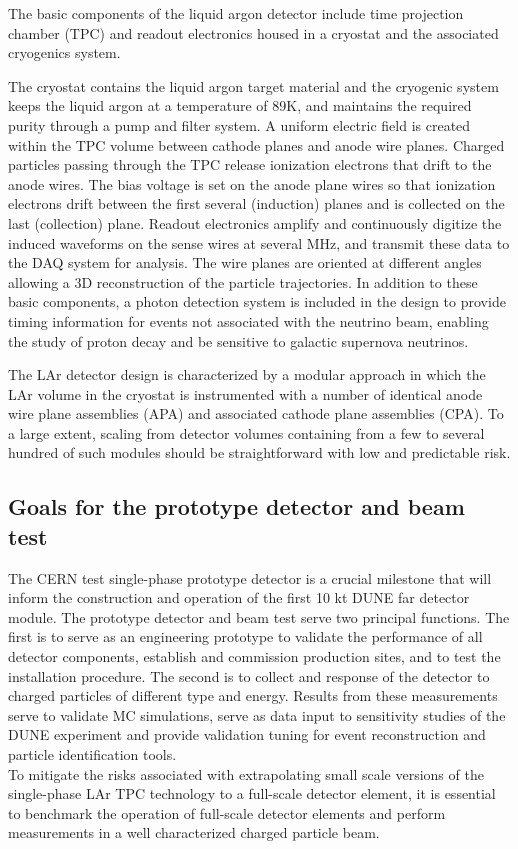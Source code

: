 The basic components of the liquid argon detector include time projection chamber (TPC) and readout electronics housed in a cryostat and the associated cryogenics system. 

The cryostat contains the liquid argon target material and the cryogenic system keeps the liquid argon at a temperature of 89K, and maintains the required purity through a pump and filter system. A uniform electric field is created within the TPC volume between cathode planes and anode wire planes. Charged particles passing through the TPC release ionization electrons that drift to the anode wires. The bias voltage is set on the anode plane wires so that ionization electrons drift between the first several (induction) planes and is collected on the last (collection) plane. Readout electronics amplify and continuously digitize the induced waveforms on the sense wires at several MHz, and transmit these data to the DAQ system for analysis. The wire planes are oriented at different angles allowing a 3D reconstruction of the particle trajectories. In addition to these basic components, a photon detection system
is included in the design to provide timing information for events not associated with the neutrino beam, enabling the study of proton decay and be sensitive to galactic supernova neutrinos.

The LAr detector design is characterized by a modular approach in which the LAr volume in the cryostat is instrumented with a number of identical anode wire plane assemblies (APA) and associated cathode plane assemblies (CPA). To a large extent, scaling from detector volumes containing from a few to several hundred of such modules should be straightforward with low and predictable risk.


\subsection{Goals for the prototype detector and beam test}


The CERN test single-phase prototype detector is a crucial milestone that will inform the construction and operation of the first 10 kt DUNE far detector module.  The prototype detector and beam test serve two principal functions. 
The first is to serve as an engineering prototype to validate the performance of all detector components,
establish and commission production sites, and to test the installation procedure. 
The second is to collect and response of the detector to charged particles of different type and energy. 
Results from these measurements serve to validate MC simulations, serve as data input to sensitivity studies 
of the DUNE experiment and provide validation tuning for event reconstruction and particle identification tools.\\
To mitigate the risks associated with extrapolating small scale versions of the single-phase LAr TPC technology 
to a full-scale detector element, it is essential to benchmark the operation of full-scale detector elements
and perform measurements in a well characterized charged particle beam.  

